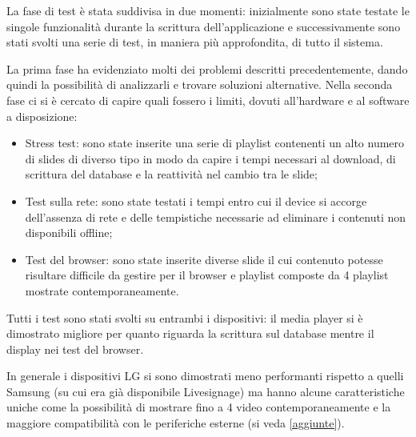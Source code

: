 La fase di test è stata suddivisa in due momenti: inizialmente sono state testate le singole funzionalità durante la scrittura dell'applicazione e successivamente sono stati svolti una serie di test, in maniera più approfondita, di tutto il sistema.

La prima fase ha evidenziato molti dei problemi descritti precedentemente, dando quindi la possibilità di analizzarli e trovare soluzioni alternative.
Nella seconda fase ci si è cercato di capire quali fossero i limiti, dovuti all'hardware e al software a disposizione:
\begin{itemize}
    \item Stress test: sono state inserite una serie di playlist contenenti un alto numero di slides di diverso tipo in modo da capire i tempi necessari al download, di scrittura del database e la reattività nel cambio tra le slide;
    \item Test sulla rete: sono state testati i tempi entro cui il device si accorge dell'assenza di rete e delle tempistiche necessarie ad eliminare i contenuti non disponibili offline;
    \item Test del browser: sono state inserite diverse slide il cui contenuto potesse risultare difficile da gestire per il browser e playlist composte da 4 playlist mostrate contemporaneamente.
\end{itemize}

Tutti i test sono stati svolti su entrambi i dispositivi: il media player si è dimostrato migliore per quanto riguarda la scrittura sul database mentre il display nei test del browser.

In generale i dispositivi LG si sono dimostrati meno performanti rispetto a quelli Samsung (su cui era già disponibile Livesignage) ma hanno alcune caratteristiche uniche come la possibilità di mostrare fino a 4 video contemporaneamente e la maggiore compatibilità con le periferiche esterne (si veda \ref*{aggiunte}).